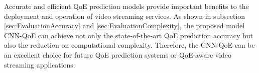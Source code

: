 Accurate and efficient QoE prediction models provide important benefits to the deployment and operation of video streaming services.
As shown in subsection \ref{sec:EvaluationAccuracy} and \ref{sec:EvaluationComplexity}, the proposed model CNN-QoE can achieve not only the state-of-the-art QoE prediction accuracy but also the reduction on computational complexity.
Therefore, the CNN-QoE can be an excellent choice for future QoE prediction systems or QoE-aware video streaming applications.
